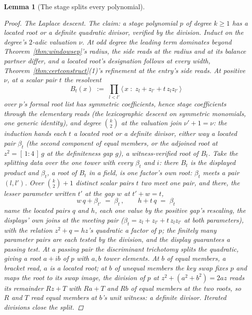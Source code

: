 \documentclass[11pt]{article}
\newtheorem{lemma}{Lemma}
\theoremstyle{definition}
\begin{document}
\begin{lemma}[The stage splits every polynomial]
\begin{proof}
\emph{The Laplace descent.} The claim: a stage polynomial $p$ of
degree $k\ge1$ has a located root or a definite quadratic
divisor, verified by the division. Induct on the degree's
$2$-adic valuation $\nu$. At odd degree the leading term dominates
beyond Theorem~\ref{thm:windowsep}'s radius, the side reads at the
radius and at its balance partner differ, and a located root's
designation follows at every width,
Theorem~\ref{thm:certconstruct}(1)'s refinement at the entry's side reads.
At positive $\nu$, at a
scalar pair $t$ the resolvent
\[
B_t(x)\;:=\;\prod_{l<l'}\big\langle\,x\;:\;z_l+z_{l'}+t\,z_lz_{l'}\,\big\rangle
\]
over $p$'s formal root list has symmetric coefficients, hence stage
coefficients through the elementary reads (the lexicographic descent
on symmetric monomials, one generic identity), and degree
$\binom k2$ at the valuation join $\nu'+1=\nu$: the induction hands
each $t$ a
located root or a definite divisor, either way a located pair
$\beta_t$ (the second component of equal members, or the adjoined
root at $z^2=[\,1:4\,]\,g$ at the definiteness gap $g$), a
witness-verified root of $B_t$. Take
the splitting data over the one tower with every $\beta_t$ and
$i$: there $B_t$ is the displayed product and $\beta_t$, a root of
$B_t$ in a field, is one factor's own root: $\beta_t$ meets a pair
$(l,l')$. Over $\binom k2+1$ distinct scalar pairs $t$ two meet one
pair, and there, the lesser parameter written $t'$ at the gap $w$
at $t'+w=t$,
\[
w\,q+\beta_{t'}\;=\;\beta_t\,,
\qquad
h+t\,q\;=\;\beta_t
\]
name the located pairs $q$ and $h$, each one value by the positive
gap's rescaling, the displays' own joins at the meeting pair
($\beta_t=z_l+z_{l'}+t\,z_lz_{l'}$ at both parameters), with the
relation $z^2+q=hz$'s quadratic a factor of $p$; the finitely many
parameter pairs are each tested by the division, and the
display guarantees a passing test. At a passing pair the
discriminant trichotomy
splits the quadratic, giving a root $a+ib$ of $p$ with $a,b$ tower
elements. At $b$ of equal members, a bracket read, $a$ is a
located root; at $b$ of unequal members the key swap fixes
$p$ and maps the root to its swap image, the division of $p$
at $z^2+(a^2+b^2)=2az$ reads its remainder $Rz+T$ with $Ra+T$ and
$Rb$ of equal members at the two roots, so $R$ and $T$ read equal
members at $b$'s unit witness: a definite divisor. Iterated
divisions close the split.
\end{proof}
\end{lemma}
\end{document}
